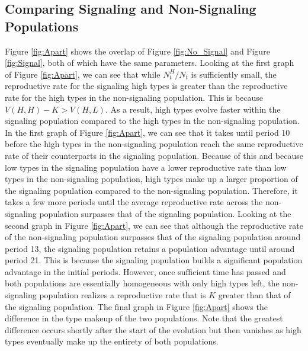 

\subsection{Comparing Signaling and Non-Signaling Populations}

Figure \ref{fig:Apart} shows the overlap of Figure \ref{fig:No_Signal} and Figure \ref{fig:Signal}, both of which have the same parameters. Looking at the first graph of Figure \ref{fig:Apart}, we can see that while $N^H_t/N_t$ is sufficiently small, the reproductive rate for the signaling high types is greater than the reproductive rate for the high types in the non-signaling population. This is because $V(H,H) - K > V(H,L)$. As a result, high types evolve faster within the signaling population compared to the high types in the non-signaling population. In the first graph of Figure \ref{fig:Apart}, we can see that it takes until period 10 before the high types in the non-signaling population reach the same reproductive rate of their counterparts in the signaling population. Because of this and because low types in the signaling population have a lower reproductive rate than low types in the non-signaling population, high types make up a larger proportion of the signaling population compared to the non-signaling population. Therefore, it takes a few more periods until the average reproductive rate across the non-signaling population surpasses that of the signaling population. Looking at the second graph in Figure \ref{fig:Apart}, we can see that although the reproductive rate of the non-signaling population surpasses that of the signaling population around period 13, the signaling population retains a population advantage until around period 21. This is because the signaling population builds a significant population advantage in the initial periods. However, once sufficient time has passed and both populations are essentially homogeneous with only high types left, the non-signaling population realizes a reproductive rate that is $K$ greater than that of the signaling population. The final graph in Figure \ref{fig:Apart} shows the difference in the type makeup of the two populations. Note that the greatest difference occurs shortly after the start of the evolution but then vanishes as high types eventually make up the entirety of both populations.


